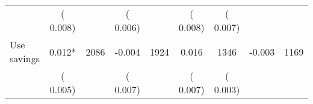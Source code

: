 \begin{tabular}{l*{8}{c}}
                       &       (       0.008)            &                               &       (       0.006)            &                               &       (       0.008)            &       (       0.007) &                  \\
Use savings        &              0.012*      &       2086       &             -0.004      &       1924       &              0.016      &       1346  &       -0.003 &       1169       \\
                       &       (       0.005)            &                               &       (       0.007)            &                               &       (       0.007)            &       (       0.003) &                  \\
\hline \end{tabular}